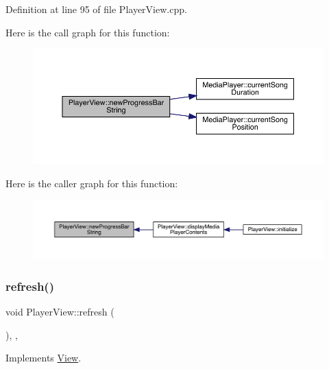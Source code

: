 Definition at line 95 of file Player\+View.\+cpp.

Here is the call graph for this function\+:
\nopagebreak
\begin{figure}[H]
\begin{center}
\leavevmode
\includegraphics[width=350pt]{class_player_view_aae1b5c77e61dfeebaa124b379206cfbc_cgraph}
\end{center}
\end{figure}
Here is the caller graph for this function\+:
\nopagebreak
\begin{figure}[H]
\begin{center}
\leavevmode
\includegraphics[width=350pt]{class_player_view_aae1b5c77e61dfeebaa124b379206cfbc_icgraph}
\end{center}
\end{figure}
\mbox{\label{class_player_view_aa0f641da279524437a48edbaf088414c}} 
\subsubsection{\texorpdfstring{refresh()}{refresh()}}
{\footnotesize\ttfamily void Player\+View\+::refresh (\begin{DoxyParamCaption}{ }\end{DoxyParamCaption})\hspace{0.3cm}{\ttfamily [inline]}, {\ttfamily [override]}, {\ttfamily [virtual]}}



Implements \mbox{\hyperlink{class_view_a6d911cc903b676dbae7c91daa5277803}{View}}.



